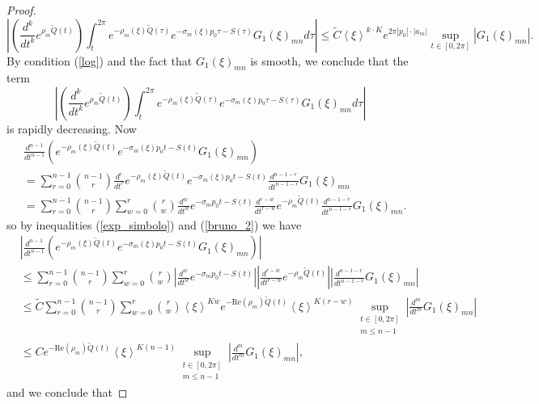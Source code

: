 \documentclass[sn-mathphys-num]{sn-jnl}%
\numberwithin{equation}{section}
\theoremstyle{thmstyleone}
\theoremstyle{thmstyletwo}
\theoremstyle{thmstylethree}
\renewcommand{\Re}{\textrm{Re}}
\def\jp#1{{\left\langle{#1}\right\rangle}}
\begin{document}
\begin{proof}
 \begin{equation} \left| \left( \frac{d^k}{dt^k} e^{\rho_m\widetilde{Q}(t)} \right) \int_t^{2\pi}e^{-\rho_m(\xi) \widetilde{Q}(\tau)}e^{-\sigma_m(\xi)p_0 \tau -S(\tau)}G_1(\xi)_{mn}d\tau \right|
   \leq \widetilde{C}  \jp{\xi}^{k\cdot K} e^{2 \pi|p_0|\cdot |a_m| } \sup_{t \in [0,2\pi]} |G_1(\xi)_{mn}|.  
 \end{equation}
 By condition (\ref{log}) and the fact that $G_1(\xi)_{mn}$ is smooth, we conclude that the term
 $$\left| \left( \frac{d^k}{dt^k} e^{\rho_m\widetilde{Q}(t)} \right) \int_t^{2\pi}e^{-\rho_m(\xi) \widetilde{Q}(\tau)}e^{-\sigma_m(\xi)p_0 \tau -S(\tau)}G_1(\xi)_{mn}d\tau \right|$$
 is rapidly decreasing. Now
 \begin{align*}
 	& \frac{d^{n-1}}{dt^{n-1}} \left(e^{-\rho_m(\xi) \widetilde{Q}(t)}e^{-\sigma_m(\xi)p_0 t -S(t)}G_1(\xi)_{mn} \right)   \\
 	& =  \sum_{r=0}^{n-1}\binom{n-1}{r} \frac{d^r}{dt^r}  e^{-\rho_m(\xi) \widetilde{Q}(t)}e^{-\sigma_m(\xi)p_0 t -S(t)} \frac{d^{n-1-r}}{dt^{n-1-r}}G_1(\xi)_{mn}  \\
    & = \sum_{r=0}^{n-1} \binom{n-1}{r} \sum_{w=0}^r \binom{r}{w} \frac{d^w}{dt^w} e^{-\sigma_m p_0 t-S(t)} \frac{d^{r-w}}{dt^{r-w}} e^{-\rho_m \widetilde{Q}(t)} \frac{d^{n-1-r}}{dt^{n-1-r}}G_1(\xi)_{mn}. 
 \end{align*}
 so by inequalities (\ref{exp_simbolo}) and (\ref{bruno_2}) we have
 \begin{align}
 	& \left| \frac{d^{n-1}}{dt^{n-1}} \left(e^{-\rho_m(\xi) \widetilde{Q}(t)}e^{-\sigma_m(\xi)p_0 t -S(t)}G_1(\xi)_{mn} \right) \right| \nonumber \\
 	& \leq \sum_{r=0}^{n-1} \binom{n-1}{r} \sum_{w=0}^r \binom{r}{w} \left|\frac{d^w}{dt^w} e^{-\sigma_m p_0 t-S(t)} \right| \left| \frac{d^{r-w}}{dt^{r-w}} e^{-\rho_m \widetilde{Q}(t)}\right| \left|\frac{d^{n-1-r}}{dt^{n-1-r}}G_1(\xi)_{mn} \right| \nonumber \\
 	& \leq \widetilde{C} \sum_{r=0}^{n-1} \binom{n-1}{r} \sum_{w=0}^r \binom{r}{w} \jp{\xi}^{Kw} e^{-\Re(\rho_m)\widetilde{Q}(t)} \jp{\xi}^{K(r-w)} \sup_{\substack{t \in [0,2\pi] \\ m\leq n-1}} \left|\frac{d^{m}}{dt^{m}}G_1(\xi)_{mn} \right| \nonumber \\
 	& \leq C e^{-\Re(\rho_m)\widetilde{Q}(t)} \jp{\xi}^{K(n-1)}\sup_{\substack{t \in [0,2\pi] \\ m\leq n-1}} \left|\frac{d^{m}}{dt^{m}}G_1(\xi)_{mn} \right|,
 \end{align}
 and we conclude that

\end{proof}
\end{document}
